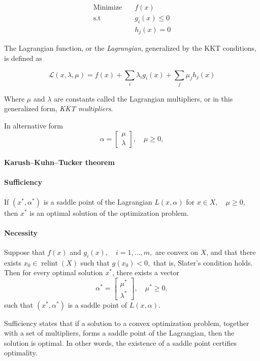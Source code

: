 \documentclass[12pt, openany]{article}
\begin{document}
\[
\begin{aligned}
\text{Minimize} & \quad
f(x) \\[4pt]
\text{s.t} & \quad g_i(x)\le 0 \\[4pt]
&\quad  h_j(x)=0
\end{aligned}
\]

The Lagrangian function, or the \textit{Lagrangian}, generalized by the KKT conditions, is defined as

\begin{equation}
    \mathcal L(x,\lambda,\mu)=f(x)+\sum_i \lambda_i g_i(x)+\sum_j \mu_j h_j(x)
\end{equation}


Where \(\mu\) and \(\lambda\) are constants called the Lagrangian multipliers, or in this generalized form, \textit{KKT multipliers}.

In alternative form
\[ 
\alpha = \begin{bmatrix} \mu\\ \lambda\end{bmatrix}, \quad \mu \ge 0, 
\] 

\paragraph{Karush–Kuhn–Tucker theorem} 
\paragraph{Sufficiency} If \( (x^*, \alpha^*) \) is a saddle point of the Lagrangian \( L(x,\alpha)\) for \( x \in X, \quad \mu \ge 0 \), then \(x^*\) is an optimal solution of the optimization problem. 

\paragraph{Necessity} Suppose that \( f(x) \) and \( g_i(x), \quad i=1,\dots,m, \) are convex on \(X\), and that there exists \( x_0 \in \operatorname{relint}(X) \) such that \( g(x_0) < 0, \) that is, Slater's condition holds. Then for every optimal solution \(x^\ast\), there exists a vector 
\[ 
\alpha^\ast = \begin{bmatrix} \mu^\ast \\ \lambda^\ast \end{bmatrix}, \quad \mu^\ast \ge 0, 
\] 
such that \( (x^\ast,\alpha^\ast) \) is a saddle point of \( L(x,\alpha). \)

Sufficiency states that if a solution to a convex optimization problem, together with a set of multipliers, forms a saddle point of the Lagrangian, then the solution is optimal. In other words, the existence of a saddle point certifies optimality.
\end{document}

